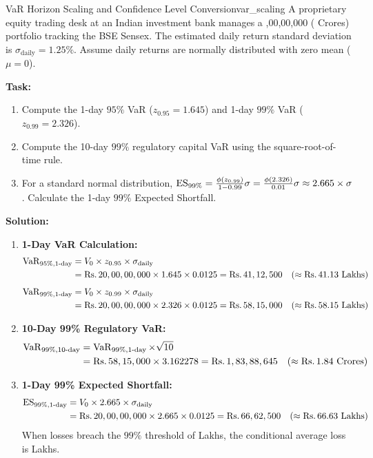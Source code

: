 \begin{example}{VaR Horizon Scaling and Confidence Level Conversion}{var_scaling}
A proprietary equity trading desk at an Indian investment bank manages a ,00,00,000 ( Crores) portfolio tracking the BSE Sensex. The estimated daily return standard deviation is $\sigma_{\text{daily}} = 1.25\%$. Assume daily returns are normally distributed with zero mean ($\mu = 0$).

\textbf{Task:}
\begin{enumerate}[leftmargin=1.2em, itemsep=2pt]
    \item Compute the 1-day $95\%$ VaR ($z_{0.95} = 1.645$) and 1-day $99\%$ VaR ($z_{0.99} = 2.326$).
    \item Compute the 10-day $99\%$ regulatory capital VaR using the square-root-of-time rule.
    \item For a standard normal distribution, $\operatorname{ES}_{99\%} = \frac{\phi(z_{0.99})}{1 - 0.99} \sigma = \frac{\phi(2.326)}{0.01} \sigma \approx 2.665 \times \sigma$. Calculate the 1-day $99\%$ Expected Shortfall.
\end{enumerate}

\textbf{Solution:}
\begin{enumerate}[leftmargin=1.2em, itemsep=2pt]
    \item \textbf{1-Day VaR Calculation:}
    \begin{align*}
    \operatorname{VaR}_{95\%, 1\text{-day}} &= V_0 \times z_{0.95} \times \sigma_{\text{daily}} \\
    &= \text{Rs.}\, 20,00,00,000 \times 1.645 \times 0.0125 = \text{Rs.}\, 41,12,500 \quad (\approx \text{Rs.}\, 41.13 \text{ Lakhs}) \\[0.15cm]
    \operatorname{VaR}_{99\%, 1\text{-day}} &= V_0 \times z_{0.99} \times \sigma_{\text{daily}} \\
    &= \text{Rs.}\, 20,00,00,000 \times 2.326 \times 0.0125 = \text{Rs.}\, 58,15,000 \quad (\approx \text{Rs.}\, 58.15 \text{ Lakhs})
    \end{align*}
    \item \textbf{10-Day 99\% Regulatory VaR:}
    \begin{align*}
    \operatorname{VaR}_{99\%, 10\text{-day}} &= \operatorname{VaR}_{99\%, 1\text{-day}} \times \sqrt{10} \\
    &= \text{Rs.}\, 58,15,000 \times 3.162278 = \text{Rs.}\, 1,83,88,645 \quad (\approx \text{Rs.}\, 1.84 \text{ Crores})
    \end{align*}
    \item \textbf{1-Day 99\% Expected Shortfall:}
    \begin{align*}
    \operatorname{ES}_{99\%, 1\text{-day}} &= V_0 \times 2.665 \times \sigma_{\text{daily}} \\
    &= \text{Rs.}\, 20,00,00,000 \times 2.665 \times 0.0125 = \text{Rs.}\, 66,62,500 \quad (\approx \text{Rs.}\, 66.63 \text{ Lakhs})
    \end{align*}
    When losses breach the $99\%$ threshold of  Lakhs, the conditional average loss is  Lakhs.
\end{enumerate}
\end{example}

